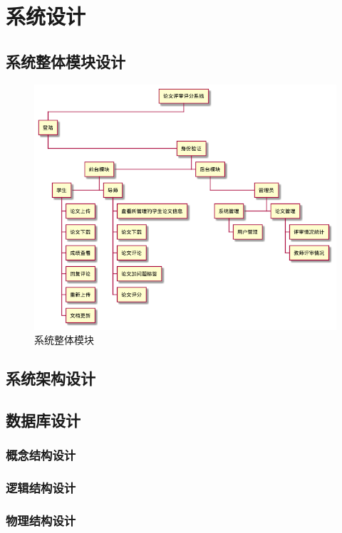 
\chapter{系统设计}

\label{chap07}


\section{系统整体模块设计}

\begin{figure}[h]
	\centering
	\includegraphics[scale = 0.6]{out/uml/WBS/系统WBS/系统WBS.png}
	\caption{\song\wuhao 系统整体模块}
\end{figure}

\section{系统架构设计}



\section{数据库设计}
\subsection{概念结构设计}
\subsection{逻辑结构设计}
\subsection{物理结构设计}

